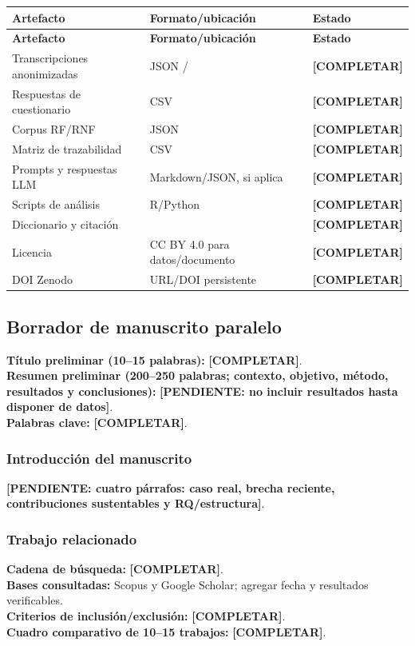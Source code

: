 \documentclass[12pt,journal,onecolumn]{IEEEtran}
\newcommand{\pendiente}[1]{\textcolor{red!70!black}{\textbf{[PENDIENTE: #1]}}}
\newcommand{\completar}{\textcolor{red!70!black}{\textbf{[COMPLETAR]}}}
\begin{document}
\begin{longtable}{P{0.30\textwidth}P{0.34\textwidth}P{0.28\textwidth}}\toprule
\textbf{Artefacto} & \textbf{Formato/ubicación} & \textbf{Estado}\\\midrule\endfirsthead
\toprule\textbf{Artefacto} & \textbf{Formato/ubicación} & \textbf{Estado}\\\midrule\endhead
Transcripciones anonimizadas & JSON /  & \completar\\
Respuestas de cuestionario & CSV & \completar\\
Corpus RF/RNF & JSON & \completar\\
Matriz de trazabilidad & CSV & \completar\\
Prompts y respuestas LLM & Markdown/JSON, si aplica & \completar\\
Scripts de análisis & R/Python & \completar\\
Diccionario y citación &  & \completar\\
Licencia & CC BY 4.0 para datos/documento & \completar\\
DOI Zenodo & URL/DOI persistente & \completar\\\bottomrule
\end{longtable}

\subsection{Borrador de manuscrito paralelo}
\textbf{Título preliminar (10--15 palabras):} \completar.\\
\textbf{Resumen preliminar (200--250 palabras; contexto, objetivo, método, resultados y conclusiones):} \pendiente{no incluir resultados hasta disponer de datos}.\\
\textbf{Palabras clave:} \completar.

\subsubsection{Introducción del manuscrito}
\pendiente{cuatro párrafos: caso real, brecha reciente, contribuciones sustentables y RQ/estructura}.

\subsubsection{Trabajo relacionado}
\textbf{Cadena de búsqueda:} \completar.\\
\textbf{Bases consultadas:} Scopus y Google Scholar; agregar fecha y resultados verificables.\\
\textbf{Criterios de inclusión/exclusión:} \completar.\\
\textbf{Cuadro comparativo de 10--15 trabajos:} \completar.
\end{document}
